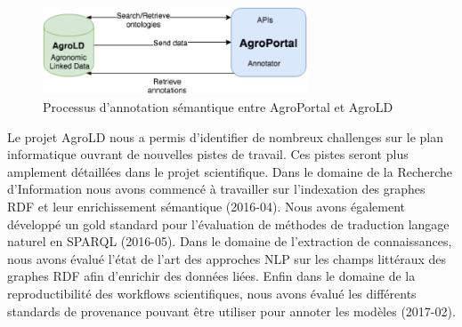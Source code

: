 
\begin{figure}[!ht]
\begin{center}
	\includegraphics[width=0.70\textwidth]{Figures/AgroPortal-AgroLD.png}
\end{center}
\caption{\label{AgroPortal-AgroLD} Processus d'annotation sémantique entre AgroPortal et AgroLD}
\end{figure}

Le projet AgroLD nous a permis d’identifier de nombreux challenges sur le plan informatique ouvrant de nouvelles pistes de travail. Ces pistes seront plus amplement détaillées dans le projet scientifique. Dans le domaine de la Recherche d’Information nous avons commencé à travailler sur l’indexation des graphes RDF et leur enrichissement sémantique (2016-04). %
Nous avons également développé un gold standard pour l’évaluation de méthodes de traduction langage naturel en SPARQL (2016-05). Dans le domaine de l’extraction de connaissances, nous avons évalué l’état de l’art des approches NLP sur les champs littéraux des graphes RDF afin d’enrichir des données liées. Enfin dans le domaine de la reproductibilité des workflows scientifiques, nous avons évalué les différents standards de provenance pouvant être utiliser pour annoter les modèles (2017-02). 


